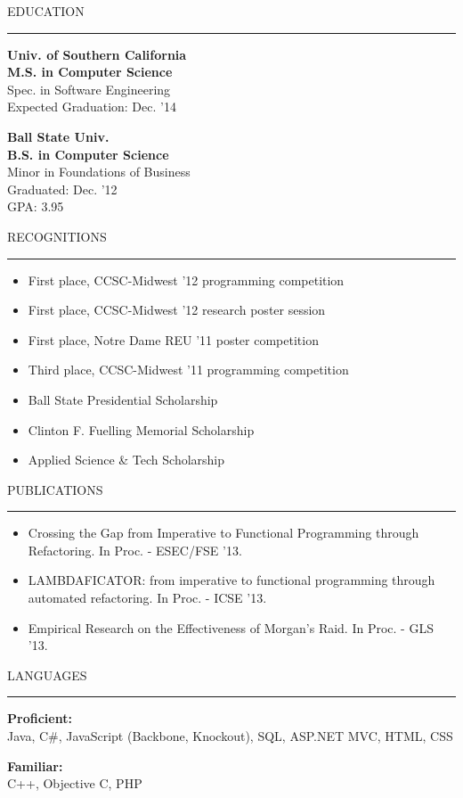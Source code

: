 \documentclass[a4paper,10pt]{article}
\newcommand{\header}[1]
{
{\Large{\uppercase{#1}}}
\vspace{0.05in}
\hrule
\vspace{0.15in}
}
\newcommand{\spacer}{\vspace*{1\baselineskip}}
\newenvironment{details}
{\begin{itemize}[label=\Squarepipe,leftmargin=0.2in]}
{\end{itemize}}
\begin{document}
\begin{minipage}[t]{0.35\textwidth}
\header{Education}

\textbf{Univ. of Southern California\\
M.S. in Computer Science\\}
Spec. in Software Engineering\\
Expected Graduation: Dec. '14
\spacer

\textbf{Ball State Univ.\\
B.S. in Computer Science\\}
Minor in Foundations of Business\\
Graduated: Dec. '12\\
GPA: 3.95

\spacer

\header{Recognitions}

\vspace{-0.1in}
\begin{details}
  \item First place, CCSC-Midwest '12 programming competition
  \item First place, CCSC-Midwest '12 research poster session
  \item First place, Notre Dame REU '11 poster competition
  \item Third place, CCSC-Midwest '11 programming competition
  \item Ball State Presidential Scholarship
  \item Clinton F. Fuelling Memorial Scholarship
  \item Applied Science \& Tech Scholarship
\end{details}
\vspace{-0.1in}

\spacer

\header{Publications}

\vspace{-0.1in}
\begin{details}
  \item
  Crossing the Gap from Imperative to Functional Programming through Refactoring.
  In Proc. - ESEC/FSE '13.
  
  \item 
  LAMBDAFICATOR: from imperative to functional programming through automated refactoring. 
  In Proc. - ICSE '13.
  
  \item
  Empirical Research on the Effectiveness of Morgan's Raid.
  In Proc. - GLS '13.
\end{details}
\vspace{-0.1in}

\spacer

\header{Languages}

\textbf{Proficient:}\\
Java, C\#, JavaScript (Backbone, Knockout), SQL, ASP.NET MVC, HTML, CSS

\textbf{Familiar:}\\
C++, Objective C, PHP

\end{minipage}
\end{document}
